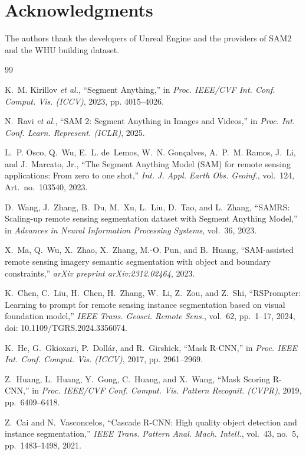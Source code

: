 \documentclass[letterpaper,journal]{IEEEtran}
\begin{document}
\section*{Acknowledgments}
The authors thank the developers of Unreal Engine and the providers of SAM2 and the WHU building dataset.


\begin{thebibliography}{99}


K.~M. Kirillov \textit{et al.}, ``Segment Anything,'' in \textit{Proc. IEEE/CVF Int. Conf. Comput. Vis. (ICCV)}, 2023, pp. 4015--4026.

N.~Ravi \textit{et al.}, ``SAM 2: Segment Anything in Images and Videos,'' in \textit{Proc. Int. Conf. Learn. Represent. (ICLR)}, 2025.

L.~P. Osco, Q.~Wu, E.~L. de~Lemos, W.~N. Gon\c{c}alves, A.~P.~M. Ramos, J.~Li, and J.~Marcato, Jr., ``The Segment Anything Model (SAM) for remote sensing applications: From zero to one shot,'' \textit{Int. J. Appl. Earth Obs. Geoinf.}, vol.~124, Art.~no.~103540, 2023.

D.~Wang, J.~Zhang, B.~Du, M.~Xu, L.~Liu, D.~Tao, and L.~Zhang, ``SAMRS: Scaling-up remote sensing segmentation dataset with Segment Anything Model,'' in \textit{Advances in Neural Information Processing Systems}, vol.~36, 2023.

X.~Ma, Q.~Wu, X.~Zhao, X.~Zhang, M.-O. Pun, and B.~Huang, ``SAM-assisted remote sensing imagery semantic segmentation with object and boundary constraints,'' \textit{arXiv preprint arXiv:2312.02464}, 2023.

K.~Chen, C.~Liu, H.~Chen, H.~Zhang, W.~Li, Z.~Zou, and Z.~Shi, ``RSPrompter: Learning to prompt for remote sensing instance segmentation based on visual foundation model,'' \textit{IEEE Trans. Geosci. Remote Sens.}, vol.~62, pp.~1--17, 2024, doi: 10.1109/TGRS.2024.3356074.

K.~He, G.~Gkioxari, P.~Doll\'ar, and R.~Girshick, ``Mask R-CNN,'' in \textit{Proc. IEEE Int. Conf. Comput. Vis. (ICCV)}, 2017, pp. 2961--2969.

Z.~Huang, L.~Huang, Y.~Gong, C.~Huang, and X.~Wang, ``Mask Scoring R-CNN,'' in \textit{Proc. IEEE/CVF Conf. Comput. Vis. Pattern Recognit. (CVPR)}, 2019, pp.~6409--6418.

Z.~Cai and N.~Vasconcelos, ``Cascade R-CNN: High quality object detection and instance segmentation,'' \textit{IEEE Trans. Pattern Anal. Mach. Intell.}, vol.~43, no.~5, pp.~1483--1498, 2021.


\end{thebibliography}
\end{document}
